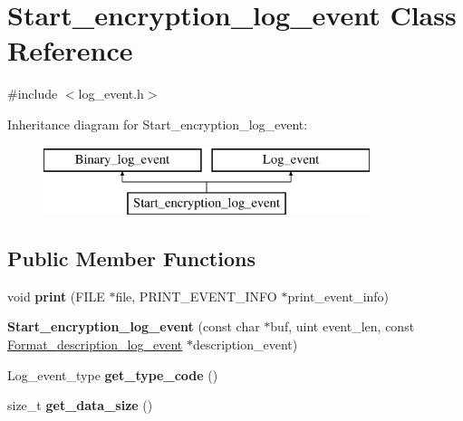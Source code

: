 \hypertarget{classStart__encryption__log__event}{}\section{Start\+\_\+encryption\+\_\+log\+\_\+event Class Reference}
\label{classStart__encryption__log__event}


{\ttfamily \#include $<$log\+\_\+event.\+h$>$}

Inheritance diagram for Start\+\_\+encryption\+\_\+log\+\_\+event\+:\begin{figure}[H]
\begin{center}
\leavevmode
\includegraphics[height=2.000000cm]{classStart__encryption__log__event}
\end{center}
\end{figure}
\subsection*{Public Member Functions}
\begin{DoxyCompactItemize}
\item 
\mbox{\label{classStart__encryption__log__event_a4412bb2a90ba7fa067c5089e9042fd6a}} 
void {\bfseries print} (F\+I\+LE $\ast$file, P\+R\+I\+N\+T\+\_\+\+E\+V\+E\+N\+T\+\_\+\+I\+N\+FO $\ast$print\+\_\+event\+\_\+info)
\item 
\mbox{\label{classStart__encryption__log__event_a93f1e9a2b959d00104e5c9d8b3d9ec8d}} 
{\bfseries Start\+\_\+encryption\+\_\+log\+\_\+event} (const char $\ast$buf, uint event\+\_\+len, const \mbox{\hyperlink{classFormat__description__log__event}{Format\+\_\+description\+\_\+log\+\_\+event}} $\ast$description\+\_\+event)
\item 
\mbox{\label{classStart__encryption__log__event_a61ca5f707fac4b3ba0145f29b5adb1c6}} 
Log\+\_\+event\+\_\+type {\bfseries get\+\_\+type\+\_\+code} ()
\item 
\mbox{\label{classStart__encryption__log__event_a774f8995458bd22953b07d96b6fac529}} 
size\+\_\+t {\bfseries get\+\_\+data\+\_\+size} ()
\end{DoxyCompactItemize}
